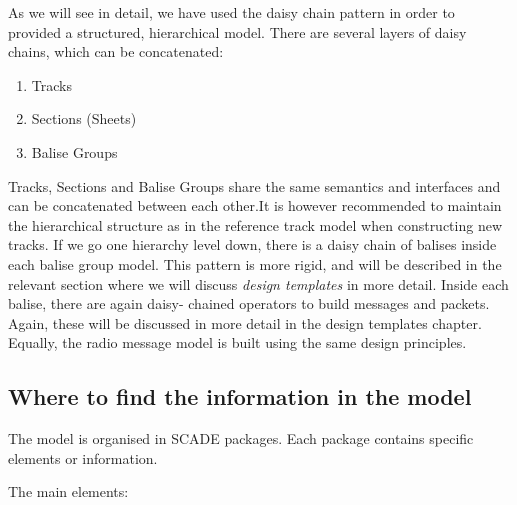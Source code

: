 \documentclass{template/openetcs_article}
\begin{document}
As we will see in detail, we have used the daisy chain pattern in order to provided a structured, hierarchical model. There are several layers of daisy chains, which can be concatenated:
\begin{enumerate}
 \item Tracks 
 \item Sections (Sheets)
 \item Balise Groups
\end{enumerate}
Tracks, Sections and Balise Groups share the same semantics and interfaces and can be concatenated between each other.\newline It is however recommended to maintain the hierarchical structure as in the reference track model when constructing new tracks.
If we go one hierarchy level down, there is a daisy chain of balises inside each balise group model.
This pattern is more rigid, and will be described in the relevant section where we will discuss \emph{design templates} in more detail.\newline
Inside each balise, there are again daisy- chained operators to build messages and packets. Again, these will be discussed in more detail in the design templates chapter.\newline\newline
Equally, the radio message model is built using the same design principles.


\subsection{Where to find the information in the model}

The model is organised in SCADE packages. Each package contains specific elements or information.\newline

The main elements:
\end{document}
